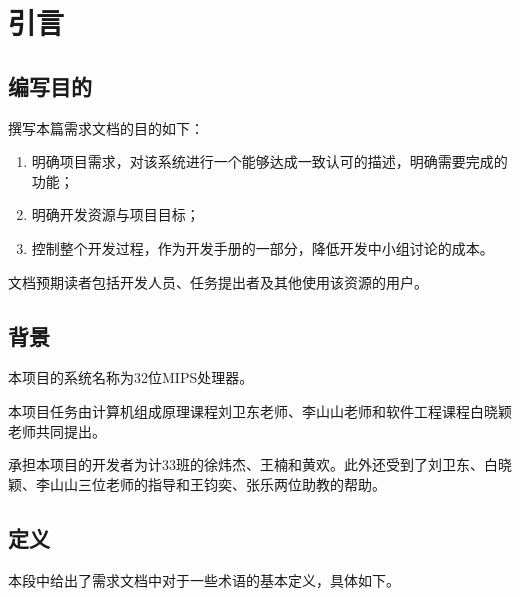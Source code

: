 \newpage
\section{引言}
\subsection{编写目的}
撰写本篇需求文档的目的如下：
\begin{enumerate}
	\item 明确项目需求，对该系统进行一个能够达成一致认可的描述，明确需要完成的功能；
	\item 明确开发资源与项目目标；
	\item 控制整个开发过程，作为开发手册的一部分，降低开发中小组讨论的成本。
\end{enumerate}

文档预期读者包括开发人员、任务提出者及其他使用该资源的用户。
\subsection{背景}
本项目的系统名称为32位MIPS处理器。

本项目任务由计算机组成原理课程刘卫东老师、李山山老师和软件工程课程白晓颖老师共同提出。

承担本项目的开发者为计33班的徐炜杰、王楠和黄欢。此外还受到了刘卫东、白晓颖、李山山三位老师的指导和王钧奕、张乐两位助教的帮助。
\subsection{定义}
本段中给出了需求文档中对于一些术语的基本定义，具体如下。

